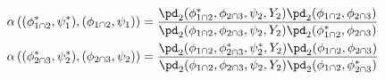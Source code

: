 \begin{align}
  \alpha \left((\phi_{1 \cap 2}^{*}, \psi_{1}^{*}), (\phi_{1 \cap 2}, \psi_{1})\right) &= 
  \frac {
    \pd_{2}(\phi_{1 \cap 2}^{*}, \phi_{2 \cap 3}, \psi_{2}, Y_{2})
    \pd_{2}(\phi_{1 \cap 2}, \phi_{2 \cap 3})
  } {
    \pd_{2}(\phi_{1 \cap 2}, \phi_{2 \cap 3}, \psi_{2}, Y_{2})
    \pd_{2}(\phi_{1 \cap 2}^{*}, \phi_{2 \cap 3})
  }
  \\
  \alpha \left((\phi_{2 \cap 3}^{*}, \psi_{2}^{*}), (\phi_{2 \cap 3}, \psi_{2})\right) &= 
  \frac {
    \pd_{2}(\phi_{1 \cap 2}, \phi_{2 \cap 3}^{*}, \psi_{2}^{*}, Y_{2})
    \pd_{2}(\phi_{1 \cap 2}, \phi_{2 \cap 3})
  } {
    \pd_{2}(\phi_{1 \cap 2}, \phi_{2 \cap 3}, \psi_{2}, Y_{2})
    \pd_{2}(\phi_{1 \cap 2}, \phi_{2 \cap 3}^{*})
  }
  \label{eqn:stage-two-acceptance-probabilities}
\end{align}